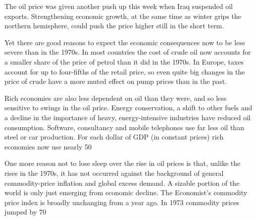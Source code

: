 The oil price was given another push up this week when Iraq suspended oil exports. Strengthening economic growth, at the same time as winter grips the northern hemisphere, could push the price higher still in the short term.

Yet there are good reasons to expect the economic consequences now to be less severe than in the 1970s. In most countries the cost of crude oil now accounts for a smaller share of the price of petrol than it did in the 1970s. In Europe, taxes account for up to four-fifths of the retail price, so even quite big changes in the price of crude have a more muted effect on pump prices than in the past.

Rich economies are also less dependent on oil than they were, and so less sensitive to swings in the oil price. Energy conservation, a shift to other fuels and a decline in the importance of heavy, energy-intensive industries have reduced oil consumption. Software, consultancy and mobile telephones use far less oil than steel or car production. For each dollar of GDP (in constant prices) rich economies now use nearly 50%

One more reason not to lose sleep over the rise in oil prices is that, unlike the rises in the 1970s, it has not occurred against the background of general commodity-price inflation and global excess demand. A sizable portion of the world is only just emerging from economic decline. The Economist’s commodity price index is broadly unchanging from a year ago. In 1973 commodity prices jumped by 70%


